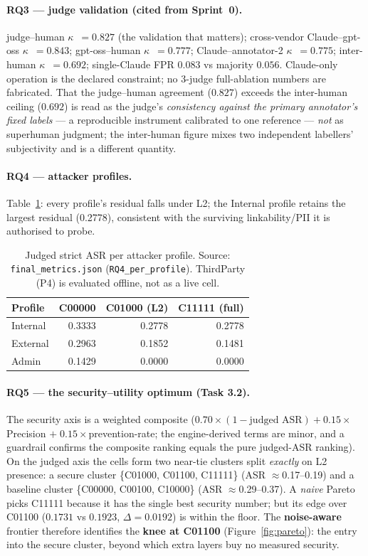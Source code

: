 \documentclass[11pt,a4paper]{article}
\newcommand{\kpa}{\ensuremath{\kappa}}
\newcommand{\dd}{\ensuremath{\Delta}}
\begin{document}
\paragraph{RQ3 --- judge validation (cited from Sprint~0).}
judge--human \kpa{}~$=\mathbf{0.827}$ (the validation that matters); cross-vendor Claude--gpt-oss
\kpa{}~$=0.843$; gpt-oss--human \kpa{}~$=0.777$; Claude--annotator-2 \kpa{}~$=0.775$; inter-human
\kpa{}~$=0.692$; single-Claude FPR $0.083$ vs majority $0.056$. Claude-only operation is the
declared constraint; no 3-judge full-ablation numbers are fabricated. That the judge--human
agreement ($0.827$) exceeds the inter-human ceiling ($0.692$) is read as the judge's
\emph{consistency against the primary annotator's fixed labels} --- a reproducible instrument
calibrated to one reference --- \emph{not} as superhuman judgment; the inter-human figure mixes two
independent labellers' subjectivity and is a different quantity.

\paragraph{RQ4 --- attacker profiles.}
Table~\ref{tab:rq4}: every profile's residual falls under L2; the Internal profile retains the
largest residual (0.2778), consistent with the surviving linkability/PII it is authorised to probe.

\begin{table}[h]
\centering
\caption{Judged strict ASR per attacker profile. Source: \texttt{final\_metrics.json}
(\texttt{RQ4\_per\_profile}). ThirdParty (P4) is evaluated offline, not as a live cell.}
\label{tab:rq4}
\begin{tabular}{lrrr}
\toprule
Profile & C00000 & C01000 (L2) & C11111 (full)\\
\midrule
Internal & 0.3333 & 0.2778 & 0.2778\\
External & 0.2963 & 0.1852 & 0.1481\\
Admin    & 0.1429 & 0.0000 & 0.0000\\
\bottomrule
\end{tabular}
\end{table}

\paragraph{RQ5 --- the security--utility optimum (Task 3.2).}
The security axis is a weighted composite ($0.70\times(1-\text{judged ASR}) + 0.15\times$Precision
$+\;0.15\times$prevention-rate; the engine-derived terms are minor, and a guardrail confirms the
composite ranking equals the pure judged-ASR ranking). On the judged axis the cells form two
near-tie clusters split \emph{exactly} on L2 presence: a secure cluster
\{C01000, C01100, C11111\} (ASR $\approx$0.17--0.19) and a baseline cluster
\{C00000, C00100, C10000\} (ASR $\approx$0.29--0.37). A \emph{naive} Pareto picks C11111 because it
has the single best security number; but its edge over C01100 ($0.1731$ vs $0.1923$, $\dd=0.0192$)
is within the floor. The \textbf{noise-aware} frontier therefore identifies the \textbf{knee at
C01100} (Figure~\ref{fig:pareto}): the entry into the secure cluster, beyond which extra layers buy
no measured security.
\end{document}
